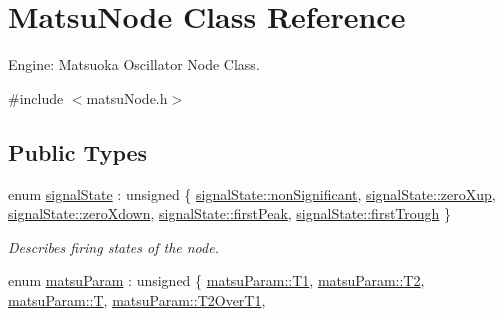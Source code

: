 \hypertarget{classMatsuNode}{}\section{Matsu\+Node Class Reference}
\label{classMatsuNode}


Engine\+: Matsuoka Oscillator Node Class.  




{\ttfamily \#include $<$matsu\+Node.\+h$>$}

\subsection*{Public Types}
\begin{DoxyCompactItemize}
\item 
enum \mbox{\hyperlink{classMatsuNode_abd587a4a72c6774f689d21c78a8bc239}{signal\+State}} \+: unsigned \{ \newline
\mbox{\hyperlink{classMatsuNode_abd587a4a72c6774f689d21c78a8bc239a0bb1b43452dec8bd11b5e9890a7f7450}{signal\+State\+::non\+Significant}}, 
\mbox{\hyperlink{classMatsuNode_abd587a4a72c6774f689d21c78a8bc239a3f079b68569f500bc365cf6513c49faf}{signal\+State\+::zero\+Xup}}, 
\mbox{\hyperlink{classMatsuNode_abd587a4a72c6774f689d21c78a8bc239a407fa5b9f845d5588e6c327b02619574}{signal\+State\+::zero\+Xdown}}, 
\mbox{\hyperlink{classMatsuNode_abd587a4a72c6774f689d21c78a8bc239a29d72117a1b778320c35281a36df8c3b}{signal\+State\+::first\+Peak}}, 
\newline
\mbox{\hyperlink{classMatsuNode_abd587a4a72c6774f689d21c78a8bc239a9c831b3d9b2ac846c1900fca753db49a}{signal\+State\+::first\+Trough}}
 \}
\begin{DoxyCompactList}\small\item\em Describes firing states of the node. \end{DoxyCompactList}\item 
enum \mbox{\hyperlink{classMatsuNode_aed801e1d0363292efc99bb02f1911386}{matsu\+Param}} \+: unsigned \{ \newline
\mbox{\hyperlink{classMatsuNode_aed801e1d0363292efc99bb02f1911386ace499dea30cfce118f4fe85da0227e83}{matsu\+Param\+::\+T1}}, 
\mbox{\hyperlink{classMatsuNode_aed801e1d0363292efc99bb02f1911386a71d2c46af01feeea54a0f541243e297b}{matsu\+Param\+::\+T2}}, 
\mbox{\hyperlink{classMatsuNode_aed801e1d0363292efc99bb02f1911386ab9ece18c950afbfa6b0fdbfa4ff731d3}{matsu\+Param\+::T}}, 
\mbox{\hyperlink{classMatsuNode_aed801e1d0363292efc99bb02f1911386a082a8ec4c12853282b09b34982d82a23}{matsu\+Param\+::\+T2\+Over\+T1}}, 

\end{DoxyCompactItemize}
